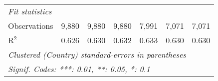\begin{tabular}{lcccccc}
   \midrule \emph{Fit statistics}\\
   Observations                                                                                        & 9,880   & 9,880          & 9,880          & 7,991          & 7,071          & 7,071\\  
   R$^2$                                                                                               & 0.626   & 0.630          & 0.632          & 0.633          & 0.630          & 0.630\\  
   \midrule
   \multicolumn{7}{l}{\emph{Clustered (Country) standard-errors in parentheses}}\\
   \multicolumn{7}{l}{\emph{Signif. Codes: ***: 0.01, **: 0.05, *: 0.1}}\\
\end{tabular}
\par\endgroup


